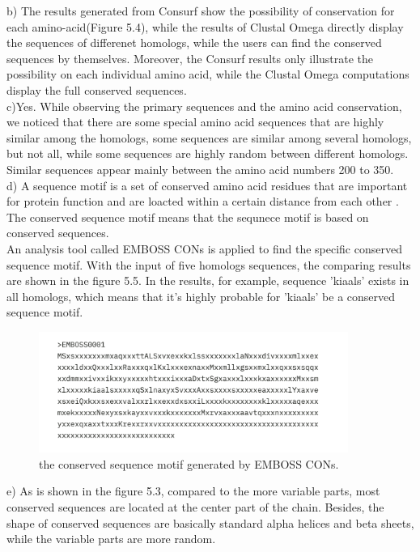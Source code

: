 \documentclass[a4paper,english,12pt,bibliography=totoc]{scrreprt}
\begin{document}
b) The results generated from Consurf show the possibility of conservation for each amino-acid(Figure 5.4), while the results of Clustal Omega directly display the sequences of differenet homologs, while the users can find the conserved sequences by themselves. Moreover, the Consurf results only illustrate the possibility on each individual amino acid, while the Clustal Omega computations display the full conserved sequences. \\


c)Yes. While observing the primary sequences and the amino acid conservation, we noticed that there are some special amino acid sequences that are highly similar among the homologs, some sequences are similar among several homologs, but not all, while some sequences are highly random between different homologs. Similar sequences appear mainly between the amino acid numbers 200 to 350.\\


d) A sequence motif is a set of conserved amino acid residues that are important for protein function and are loacted within a certain distance from each other%
. The conserved sequence motif means that the sequnece motif is based on conserved sequences. \\
An analysis tool called EMBOSS CONs is applied to find the specific conserved sequence motif. With the input of five homologs sequences, the comparing results are shown in the figure 5.5. In the results, for example, sequence 'kiaals' exists in all homologs, which means that it's highly probable for 'kiaals' be a conserved sequence motif.\\

\begin{figure}
    \centering
    \includegraphics[width = 0.9\textwidth]{Project 5/Sequence images/sequence.png}
    \caption{the conserved sequence motif generated by EMBOSS CONs.}
\end{figure}

e) As is shown in the figure 5.3, compared to the more variable parts, most conserved sequences are located at the center part of the chain. Besides, the shape of conserved sequences are basically standard alpha helices and beta sheets, while the variable parts are more random.\\

\printbibliography
\end{document}
